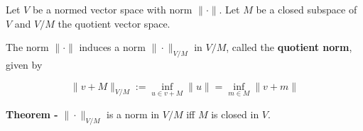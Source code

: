 \documentclass[12pt]{article}
\begin{document}
Let $V$ be a normed vector space with norm $\| \cdot \|$. Let $M$ be a closed subspace of $V$ and $V/M$ the
 quotient vector space.

The norm $\| \cdot \|$ induces a norm $\| \cdot \|_{V/M}$ in $V/M$, called the {\bf quotient norm}, given by

\begin{displaymath}
\| v+M \|_{V/M}:= \inf_{u \in v+M} \|u\| = \inf_{m \in M} \|v+m\|
\end{displaymath}

{\bf Theorem -} $\| \cdot \|_{V/M}$ is a norm in $V/M$ iff $M$ is closed in $V$.
\end{document}
